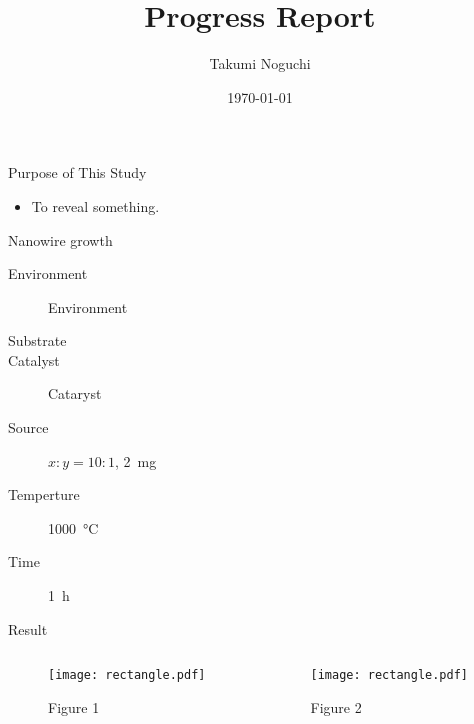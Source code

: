 \documentclass[unicode,12pt]{beamer}
\title{Progress Report}
\author{Takumi Noguchi}
\institute[kut]{Graduate School of Engineering, Kochi University of Technology, Kohno Lab.}
\date{\today}
\begin{document}
\begin{frame}
  \titlepage
\end{frame}

\begin{frame}{Purpose of This Study}
  \begin{itemize}
    \item To reveal something.
  \end{itemize}
\end{frame}

\begin{frame}{Nanowire growth}
  

  \begin{description}
    \item[Environment] Environment
    \item[Substrate] 
    \item[Catalyst] Cataryst
    \item[Source] $x : y = 10: 1$, \SI{2}{mg}
    \item[Temperture] \SI{1000}{\degreeCelsius}
    \item[Time] \SI{1}{\hour}
  \end{description}

\end{frame}


\begin{frame}{Result}
  \begin{columns}[t]
    \begin{column}{.45\linewidth}
      \begin{figure}
        \centering
        \texttt{[image: rectangle.pdf]}
        \caption{Figure 1}
      \end{figure}
    \end{column}
    \begin{column}{.45\linewidth}
      \begin{figure}
        \centering
        \texttt{[image: rectangle.pdf]}
        \caption{Figure 2}
      \end{figure}
    \end{column}
  \end{columns}
\end{frame}
\end{document}
